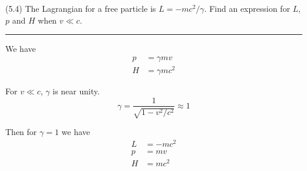 \documentclass[12pt]{article}
\begin{document}
(5.4)
The Lagrangian for a free particle is $L=-mc^2/\gamma$.
Find an expression for $L$, $p$ and $H$ when $v\ll c$.

\bigskip
\hrule

\bigskip
We have
\begin{align*}
p&=\gamma mv
\tag{5.23}
\\
H&=\gamma mc^2
\tag{5.24}
\end{align*}

For $v\ll c$, $\gamma$ is near unity.
\begin{equation*}
\gamma=\frac{1}{\sqrt{1-v^2/c^2}}\approx1
\end{equation*}

Then for $\gamma=1$ we have
\begin{align*}
L&=-mc^2
\\
p&=mv
\\
H&=mc^2
\end{align*}
\end{document}
